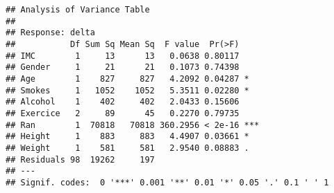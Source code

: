 \documentclass[]{article}
\newenvironment{Shaded}{\begin{snugshade}}{\end{snugshade}}
\newcommand{\KeywordTok}[1]{\textcolor[rgb]{0.13,0.29,0.53}{\textbf{#1}}}
\newcommand{\DecValTok}[1]{\textcolor[rgb]{0.00,0.00,0.81}{#1}}
\newcommand{\StringTok}[1]{\textcolor[rgb]{0.31,0.60,0.02}{#1}}
\newcommand{\OperatorTok}[1]{\textcolor[rgb]{0.81,0.36,0.00}{\textbf{#1}}}
\newcommand{\NormalTok}[1]{#1}
\begin{document}
\begin{Shaded}
\end{Shaded}

\begin{verbatim}
## Analysis of Variance Table
## 
## Response: delta
##           Df Sum Sq Mean Sq  F value  Pr(>F)    
## IMC        1     13      13   0.0638 0.80117    
## Gender     1     21      21   0.1073 0.74398    
## Age        1    827     827   4.2092 0.04287 *  
## Smokes     1   1052    1052   5.3511 0.02280 *  
## Alcohol    1    402     402   2.0433 0.15606    
## Exercice   2     89      45   0.2270 0.79735    
## Ran        1  70818   70818 360.2956 < 2e-16 ***
## Height     1    883     883   4.4907 0.03661 *  
## Weight     1    581     581   2.9540 0.08883 .  
## Residuals 98  19262     197                     
## ---
## Signif. codes:  0 '***' 0.001 '**' 0.01 '*' 0.05 '.' 0.1 ' ' 1
\end{verbatim}
\end{document}
